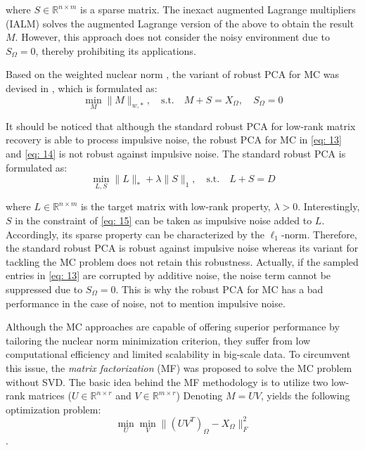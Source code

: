 where $S \in \mathbb{R}^{n \times m}$ is a sparse matrix. The inexact augmented Lagrange multipliers (IALM) \cite{rpca} solves the augmented Lagrange version of the above to obtain the result $M$. However, this approach does not consider the noisy environment due to $S_{\Omega} = 0$, thereby prohibiting its applications.

Based on the weighted nuclear norm \cite{wnnm}, the variant of robust PCA for MC was devised in \cite{wnnm}, which is formulated as:
\begin{equation}
    \min_{M} \|M\|_{w,*}, \quad \text{s.t.} \quad M + S = X_{\Omega}, \quad S_{\Omega} = 0 \label{eq: 14}
\end{equation}

It should be noticed that although the standard robust PCA for low-rank matrix recovery is able to process impulsive noise, the robust PCA for MC in \ref{eq: 13} and \ref{eq: 14} is not robust against impulsive noise. The standard robust PCA is formulated as:
\begin{equation}
    \min_{L,S} \|L\|_* + \lambda \|S\|_1, \quad \text{s.t.} \quad L + S = D \label{eq: 15}
\end{equation}

where $L \in \mathbb{R}^{n \times m}$ is the target matrix with low-rank property, $\lambda > 0$. Interestingly, $S$ in the constraint of \ref{eq: 15} can be taken as impulsive noise added to $L$. Accordingly, its sparse property can be characterized by the $\ell_1$-norm. Therefore, the standard robust PCA is robust against impulsive noise whereas its variant for tackling the MC problem does not retain this robustness. Actually, if the sampled entries in \ref{eq: 13} are corrupted by additive noise, the noise term cannot be suppressed due to $S_{\Omega} = 0$. This is why the robust PCA for MC has a bad performance in the case of noise, not to mention impulsive noise.

Although the MC approaches are capable of offering superior performance by tailoring the nuclear norm minimization criterion, they suffer from low computational efficiency and limited scalability in big-scale data. To circumvent this issue, the \textit{matrix factorization} (MF) \cite{matrix_factorization} was proposed to solve the MC problem without SVD. The basic idea behind the MF methodology is to utilize two low-rank matrices ($U \in \mathbb{R}^{n \times r}$ and $V \in \mathbb{R}^{m \times r}$) Denoting $M = UV$, yields the following optimization problem:
\[
\min_U \min_V \| (UV^T)_{\Omega} - X_{\Omega} \|_F^2
\].

